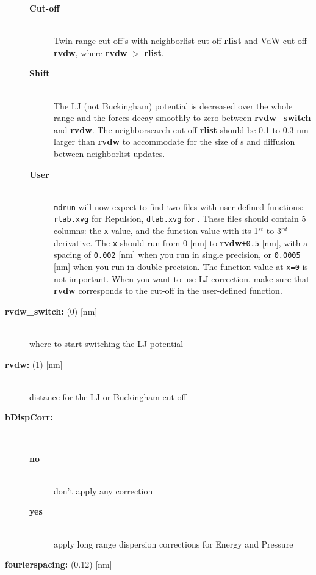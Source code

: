 \begin{description}
\vspace{-2ex}\begin{description}
\item[{\bf Cut-off}]\mbox{}\\
Twin range cut-off's with neighborlist cut-off {\bf rlist} and 
VdW cut-off {\bf rvdw},
where {\bf rvdw} {\tt $>$} {\bf rlist}.
\item[{\bf Shift}]\mbox{}\\
The LJ (not Buckingham) potential is decreased over the whole
range and the forces decay smoothly to zero between {\bf rvdw\_switch}
and {\bf rvdw}.  The neighborsearch cut-off {\bf rlist} should be
0.1 to 0.3 nm larger than {\bf rvdw} to accommodate for the size of
s and diffusion between neighborlist
updates.
\item[{\bf User}]\mbox{}\\
{\tt mdrun} will now expect to find two files with user-defined
functions: {\tt rtab.xvg} for Repulsion, {\tt dtab.xvg} for 
. These files should contain 5 columns:
the {\tt x} value, and the function value with its 1$^{st}$
to 3$^{rd}$ derivative. The {\tt x} should run from 0 [nm] to
{\bf rvdw}{\tt +0.5} [nm], with a spacing of {\tt 0.002}
[nm] when you run in single precision, or {\tt 0.0005} [nm] when
you run in double precision. The function value at {\tt x=0} is not
important. When you want to use LJ correction, make sure that {\bf rvdw}
corresponds to the cut-off in the user-defined function.
\end{description}
\item[{\bf rvdw\_switch: }(0) {[nm]}]\mbox{}\\
where to start switching the LJ potential
\item[{\bf rvdw: }(1) {[nm]}]\mbox{}\\
distance for the LJ or Buckingham cut-off
\item[{\bf bDispCorr:}]\mbox{}\\
\vspace{-2ex}\begin{description}
\item[{\bf no}]\mbox{}\\
don't apply any correction
\item[{\bf yes}]\mbox{}\\
apply long range dispersion corrections for Energy and Pressure
\end{description}
\item[{\bf fourierspacing: }(0.12) {[nm]}]\mbox{}\\

\end{description}
